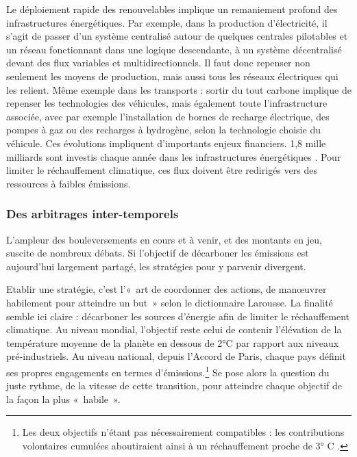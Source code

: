 Le déploiement rapide des renouvelables implique un remaniement profond des infrastructures énergétiques. Par exemple, dans la production d’électricité, il s’agit de passer d’un système centralisé autour de quelques centrales pilotables et un réseau fonctionnant dans une logique descendante, à un système décentralisé devant des flux variables et multidirectionnels. Il faut donc repenser non seulement les moyens de production, mais aussi tous les réseaux électriques qui les relient.
Même exemple dans les transports : sortir du tout carbone implique de repenser les technologies des véhicules, mais également toute l’infrastructure associée, avec par exemple l’installation de bornes de recharge électrique, des pompes à gaz ou des recharges à hydrogène, selon la technologie choisie du véhicule.
Ces évolutions impliquent d’importants enjeux financiers. 1,8 mille milliards sont investis chaque année dans les infrastructures énergétiques \citep{IEAWIR2016}. Pour limiter le réchauffement climatique, ces flux doivent être redirigés vers des ressources à faibles émissions. 

\subsubsection{Des arbitrages inter-temporels}
L’ampleur des bouleversements en cours et à venir, et des montants en jeu, suscite de nombreux débats. Si l’objectif de décarboner les émissions est aujourd’hui largement partagé, les stratégies pour y parvenir divergent. 

Etablir une stratégie, c’est l'«~art de coordonner des actions, de manœuvrer habilement pour atteindre un but~» selon le dictionnaire Larousse. La finalité semble ici claire : décarboner les sources d’énergie afin de limiter le réchauffement climatique. Au niveau mondial, l’objectif reste celui de contenir l’élévation de la température moyenne de la planète en dessous de 2°C par rapport aux niveaux pré-industriels. Au niveau national, depuis l’Accord de Paris, chaque pays définit ses propres engagements en termes d’émissions.\footnote{Les deux objectifs n’étant pas nécessairement compatibles : les contributions volontaires cumulées aboutiraient ainsi à un réchauffement proche de 3° C \citep{GICN2015}.} Se pose alors la question du juste rythme, de la vitesse de cette transition, pour atteindre chaque objectif de la façon la plus «~habile~».

